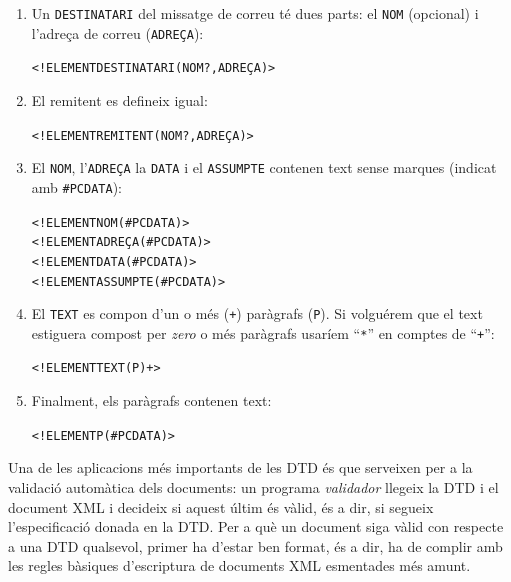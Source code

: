 \begin{enumerate}
\item Un \texttt{DESTINATARI} del missatge de correu té dues parts: el
  \texttt{NOM} (opcional) i l'adreça de correu (\texttt{ADREÇA}):
\begin{small}\begin{alltt}
<!ELEMENT DESTINATARI (NOM?, ADREÇA)>
\end{alltt}\end{small}
\item El remitent es defineix igual:
\begin{small}\begin{alltt}
<!ELEMENT REMITENT (NOM?, ADREÇA)>
\end{alltt}\end{small}
\item El \texttt{NOM}, l'\texttt{ADREÇA} la \texttt{DATA} i el
  \texttt{ASSUMPTE} contenen text sense marques (indicat amb
  \texttt{\#PCDATA}):
\begin{small}\begin{alltt}
<!ELEMENT NOM (#PCDATA)>
<!ELEMENT ADREÇA (#PCDATA)>
<!ELEMENT DATA (#PCDATA)>
<!ELEMENT ASSUMPTE (#PCDATA)>
\end{alltt}\end{small}

\item El \texttt{TEXT} es compon d'un o més (\texttt{+}) paràgrafs
  (\texttt{P}). Si volguérem que el text estiguera compost per
  \emph{zero} o més paràgrafs usaríem ``\texttt{*}'' en comptes de
  ``\texttt{+}'':
\begin{small}\begin{alltt}
<!ELEMENT TEXT (P)+>
\end{alltt}\end{small}

\item Finalment, els paràgrafs contenen text:
\begin{small}\begin{alltt}
<!ELEMENT P (#PCDATA)>
\end{alltt}\end{small}
\end{enumerate}

Una de les aplicacions més importants de les DTD és que serveixen per
a la validació automàtica dels documents: un programa \emph{validador}
llegeix la DTD i el document XML i decideix si aquest últim és vàlid,
és a dir, si segueix l'especificació donada en la DTD. Per a què un
document siga vàlid con respecte a una DTD qualsevol, primer ha
d'estar ben format, és a dir, ha de complir amb les regles bàsiques
d'escriptura de documents XML esmentades més amunt.

